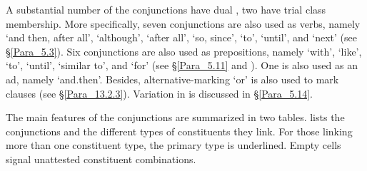 A substantial number of the conjunctions have dual , two have trial class membership. More specifically, seven conjunctions are also used as verbs, namely  ‘and then, after all’,  ‘although’,  ‘after all’,  ‘so, since’,  ‘to’,  ‘until’, and  ‘next’ (see §\ref{Para_5.3}). Six conjunctions are also used as prepositions, namely  ‘with’,  ‘like’,  ‘to’,  ‘until’,  ‘similar to’, and  ‘for’ (see §\ref{Para_5.11} and ). One  is also used as an ad, namely  ‘and.then’. Besides, alternative-marking  ‘or’ is also used to mark  clauses (see §\ref{Para_13.2.3}). Variation in  is discussed in §\ref{Para_5.14}.



The main features of the conjunctions are summarized in two tables.  lists the conjunctions and the different types of constituents they link. For those linking more than one constituent type, the primary type is underlined. Empty cells signal unattested constituent combinations.
%

